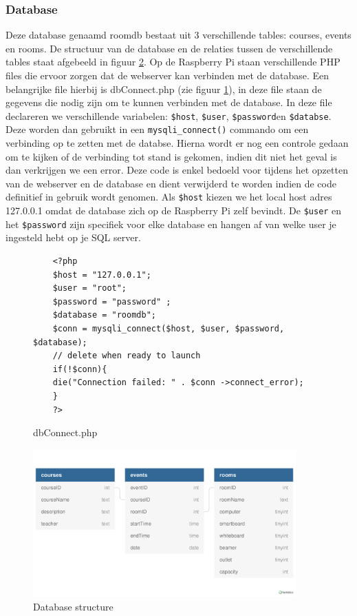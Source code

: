 \documentclass[a4paper,kul]{kulakarticle} %
\begin{document}
\subsubsection{Database}
Deze database genaamd roomdb bestaat uit 3 verschillende tables: courses, events en rooms. De structuur van de database en de relaties tussen de verschillende tables staat afgebeeld in figuur \ref{fig:dbstruct}. Op de Raspberry Pi staan verschillende PHP files die ervoor zorgen dat de webserver kan verbinden met de database. Een belangrijke file hierbij is dbConnect.php (zie figuur \ref{fig:dbconnect}), in deze file staan de gegevens die nodig zijn om te kunnen verbinden met de database. In deze  file declareren we verschillende variabelen: \verb|$host|, \verb|$user|, \verb|$password|en \verb|$databse|. Deze worden dan gebruikt in een \verb|mysqli_connect()| commando om een verbinding op te zetten met de databse. Hierna wordt er nog een controle gedaan om te kijken of de verbinding tot stand is gekomen, indien dit niet het geval is dan verkrijgen we een error. Deze code is enkel bedoeld voor tijdens het opzetten van de webserver en de database en dient verwijderd te worden indien de code definitief in gebruik wordt genomen. Als \verb|$host| kiezen we het local host adres 127.0.0.1 omdat de database zich op de Raspberry Pi zelf bevindt. De \verb|$user| en het \verb|$password| zijn specifiek voor elke database en hangen af van welke user je ingesteld hebt op je SQL server. 
\begin{figure}[h]
	\begin{verbatim}
	<?php
	$host = "127.0.0.1";
	$user = "root";
	$password = "password" ;
	$database = "roomdb";
	$conn = mysqli_connect($host, $user, $password, $database);
	// delete when ready to launch
	if(!$conn){
	die("Connection failed: " . $conn ->connect_error);
	}
	?>
	\end{verbatim}
	\caption{dbConnect.php}
	\label{fig:dbconnect}
\end{figure}
\begin{figure}[h]
	\includegraphics[width=0.9\textwidth]{dbstruct}
	\caption{Database structure}
	\label{fig:dbstruct}
\end{figure}
\end{document}
